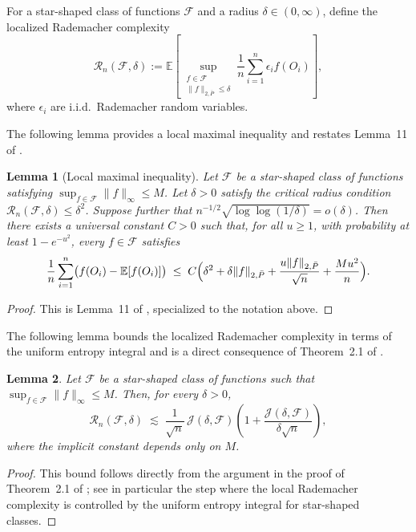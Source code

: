 \documentclass{article}
\theoremstyle{plain}
\newtheorem{lemma}{Lemma}
\theoremstyle{definition}
\theoremstyle{remark}
\begin{document}
 


For a star-shaped class of functions $\mathcal{F}$ and a radius $\delta \in (0,\infty)$,
define the localized Rademacher complexity
\[
\mathcal{R}_n(\mathcal{F}, \delta)
:=
\mathbb{E}\left[
\sup_{\substack{f \in \mathcal{F} \\\|f\|_{2,\bar P} \le \delta}}
\frac{1}{n} \sum_{i=1}^n \epsilon_i f(O_i)
\right],
\]
where $\epsilon_i$ are i.i.d.\ Rademacher random variables.

The following lemma provides a local maximal inequality and restates Lemma~11 of \cite{foster2023orthogonal}.


 


\begin{lemma}[Local maximal inequality]\label{lemma:loc_max_ineq}
Let $\mathcal{F}$ be a star-shaped class of functions satisfying
$\sup_{f\in\mathcal{F}} \|f\|_{\infty} \le M$.
Let $\delta > 0$ satisfy the critical radius condition
$\mathcal{R}_n(\mathcal{F},\delta) \le \delta^2$.
Suppose further that
$n^{-1/2}\sqrt{\log\log(1/\delta)} = o(\delta)$. Then there exists a universal constant $C>0$ such that, for all $u \ge 1$, with
probability at least $1 - e^{-u^2}$, every $f \in \mathcal{F}$ satisfies
\[
\frac{1}{n} \sum_{i=1}^n
\bigl(f(O_i) - \mathbb{E}[f(O_i)]\bigr)
\;\le\;
C\Bigl(
\delta^2
+
\delta\|f\|_{2,\bar P}
+
\frac{u\|f\|_{2,\bar P}}{\sqrt{n}}
+
\frac{M u^2}{n}
\Bigr).
\]
\end{lemma}
\begin{proof}
This is Lemma~11 of \citet{foster2023orthogonal}, specialized to the notation
above.
\end{proof}

The following lemma bounds the localized Rademacher complexity in terms of the uniform entropy integral and is a direct consequence of Theorem~2.1 of \citet{van2011local}.

 

\begin{lemma}\label{lemma:local_rademacher_entropy}
Let \(\mathcal{F}\) be a star-shaped class of functions such that
\(\sup_{f\in\mathcal F}\|f\|_\infty \le M\). Then, for every \(\delta>0\),
\[
\mathcal{R}_n(\mathcal{F}, \delta)
\;\lesssim\;
\frac{1}{\sqrt n}\,\mathcal{J}(\delta,\mathcal{F})
\left(1+\frac{\mathcal{J}(\delta,\mathcal{F})}{\delta \sqrt n}\right),
\]
where the implicit constant depends only on \(M\).
\end{lemma}
\begin{proof}
This bound follows directly from the argument in the proof of
Theorem~2.1 of \citet{van2011local}; see in particular the step where
the local Rademacher complexity is controlled by the uniform entropy
integral for star-shaped classes.
\end{proof}
 
\end{document}
